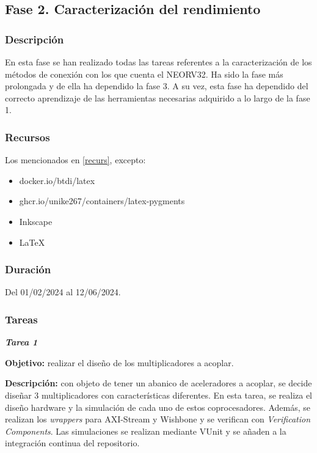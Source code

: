 \subsection{Fase 2. Caracterización del rendimiento}

\subsubsection{Descripción}

En esta fase se han realizado todas las tareas referentes a la caracterización de los métodos de conexión con los que cuenta el NEORV32.
Ha sido la fase más prolongada y de ella ha dependido la fase 3.
A su vez, esta fase ha dependido del correcto aprendizaje de las herramientas necesarias adquirido a lo largo de la fase 1.

\subsubsection{Recursos}

Los mencionados en \ref{recurs}, excepto:

\begin{itemize}
    \item docker.io/btdi/latex
    \item ghcr.io/unike267/containers/latex-pygments
    \item Inkscape
    \item \LaTeX
\end{itemize}

\subsubsection{Duración}

Del 01/02/2024 al 12/06/2024.

\subsubsection{Tareas}

\noindent \textbf{\textit{Tarea 1}}

\textbf{Objetivo:} realizar el diseño de los multiplicadores a acoplar. 

\textbf{Descripción:} con objeto de tener un abanico de aceleradores a acoplar, se decide diseñar 3 multiplicadores con características diferentes.
En esta tarea, se realiza el diseño hardware y la simulación  de cada uno de estos coprocesadores.
Además, se realizan los \textit{wrappers} para AXI-Stream y Wishbone y se verifican con \textit{Verification Components}.
Las simulaciones se realizan mediante VUnit y se añaden a la integración continua del repositorio. 

